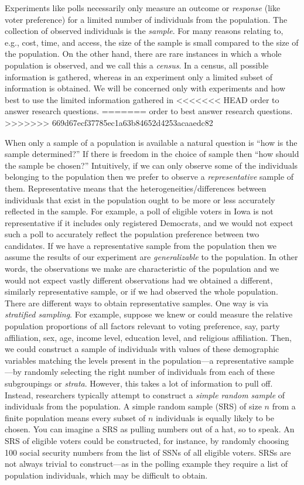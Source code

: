 \documentclass[]{book}
\begin{document}
Experiments like polls necessarily only measure an outcome or
\emph{response} (like voter preference) for a limited number of
individuals from the population. The collection of observed individuals
is the \emph{sample}. For many reasons relating to, e.g., cost, time,
and access, the size of the sample is small compared to the size of the
population. On the other hand, there are rare instances in which a whole
population is observed, and we call this a \emph{census}. In a census,
all possible information is gathered, whereas in an experiment only a
limited subset of information is obtained. We will be concerned only
with experiments and how best to use the limited information gathered in
<<<<<<< HEAD
order to answer research questions.
=======
order to best answer research questions.
>>>>>>> 669d67ecf37785ec1a63b84652d4253acaaedc82

When only a sample of a population is available a natural question is
``how is the sample determined?'' If there is freedom in the choice of
sample then ``how should the sample be chosen?'' Intuitively, if we can
only observe some of the individuals belonging to the population then we
prefer to observe a \emph{representative} sample of them. Representative
means that the heterogeneities/differences between individuals that
exist in the population ought to be more or less accurately reflected in
the sample. For example, a poll of eligible voters in Iowa is not
representative if it includes only registered Democrats, and we would
not expect such a poll to accurately reflect the population preference
between two candidates. If we have a representative sample from the
population then we assume the results of our experiment are
\emph{generalizable} to the population. In other words, the observations
we make are characteristic of the population and we would not expect
vastly different observations had we obtained a different, similarly
representative sample, or if we had observed the whole population. There
are different ways to obtain representative samples. One way is via
\emph{stratified sampling}. For example, suppose we knew or could
measure the relative population proportions of all factors relevant to
voting preference, say, party affiliation, sex, age, income level,
education level, and religious affiliation. Then, we could construct a
sample of individuals with values of these demographic variables
matching the levels present in the population---a representative
sample---by randomly selecting the right number of individuals from each
of these subgroupings or \emph{strata}. However, this takes a lot of
information to pull off. Instead, researchers typically attempt to
construct a \emph{simple random sample} of individuals from the
population. A simple random sample (SRS) of size \(n\) from a finite
population means every subset of \(n\) individuals is equally likely to
be chosen. You can imagine a SRS as pulling numbers out of a hat, so to
speak. An SRS of eligible voters could be constructed, for instance, by
randomly choosing 100 social security numbers from the list of SSNs of
all eligible voters. SRSs are not always trivial to construct---as in
the polling example they require a list of population individuals, which
may be difficult to obtain.\\
\end{document}
